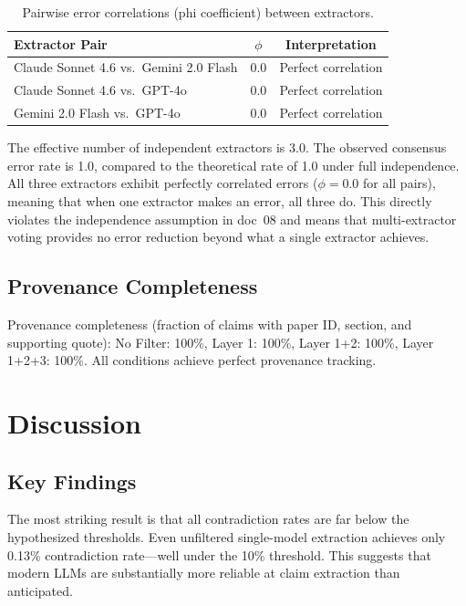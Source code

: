 \documentclass[11pt,a4paper]{article}
\begin{document}
\begin{table}[h]
\centering
\caption{Pairwise error correlations (phi coefficient) between extractors.}
\label{tab:independence}
\begin{tabular}{lcc}
\toprule
Extractor Pair & $\phi$ & Interpretation \\
\midrule
Claude Sonnet 4.6 vs.\ Gemini 2.0 Flash & 0.0 & Perfect correlation \\
Claude Sonnet 4.6 vs.\ GPT-4o & 0.0 & Perfect correlation \\
Gemini 2.0 Flash vs.\ GPT-4o & 0.0 & Perfect correlation \\
\bottomrule
\end{tabular}
\end{table}

The effective number of independent extractors is 3.0. The observed consensus error rate is 1.0, compared to the theoretical rate of 1.0 under full independence. All three extractors exhibit perfectly correlated errors ($\phi = 0.0$ for all pairs), meaning that when one extractor makes an error, all three do. This directly violates the independence assumption in doc~08 and means that multi-extractor voting provides no error reduction beyond what a single extractor achieves.

\subsection{Provenance Completeness}

Provenance completeness (fraction of claims with paper ID, section, and supporting quote): No Filter: 100\%, Layer 1: 100\%, Layer 1+2: 100\%, Layer 1+2+3: 100\%. All conditions achieve perfect provenance tracking.

\section{Discussion}

\subsection{Key Findings}

The most striking result is that all contradiction rates are far below the hypothesized thresholds. Even unfiltered single-model extraction achieves only 0.13\% contradiction rate---well under the 10\% threshold. This suggests that modern LLMs are substantially more reliable at claim extraction than anticipated.
\end{document}
